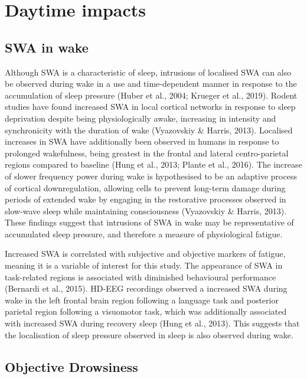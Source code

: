 \documentclass[
]{article}
\begin{document}
\section{Daytime impacts}\label{daytime-impacts}

\subsection{SWA in wake}\label{swa-in-wake}

Although SWA is a characteristic of sleep, intrusions of localised SWA
can also be observed during wake in a use and time-dependent manner in
response to the accumulation of sleep pressure (Huber et al., 2004;
Krueger et al., 2019). Rodent studies have found increased SWA in local
cortical networks in response to sleep deprivation despite being
physiologically awake, increasing in intensity and synchronicity with
the duration of wake (Vyazovskiy \& Harris, 2013). Localised increases
in SWA have additionally been observed in humans in response to
prolonged wakefulness, being greatest in the frontal and lateral
centro-parietal regions compared to baseline (Hung et al., 2013; Plante
et al., 2016). The increase of slower frequency power during wake is
hypothesised to be an adaptive process of cortical downregulation,
allowing cells to prevent long-term damage during periods of extended
wake by engaging in the restorative processes observed in slow-wave
sleep while maintaining consciousness (Vyazovskiy \& Harris, 2013).
These findings suggest that intrusions of SWA in wake may be
representative of accumulated sleep pressure, and therefore a measure of
physiological fatigue.

Increased SWA is correlated with subjective and objective markers of
fatigue, meaning it is a variable of interest for this study. The
appearance of SWA in task-related regions is associated with diminished
behavioural performance (Bernardi et al., 2015). HD-EEG recordings
observed a increased SWA during wake in the left frontal brain region
following a language task and posterior parietal region following a
visuomotor task, which was additionally associated with increased SWA
during recovery sleep (Hung et al., 2013). This suggests that the
localisation of sleep pressure observed in sleep is also observed during
wake.

\subsection{Objective Drowsiness}\label{objective-drowsiness}
\end{document}
